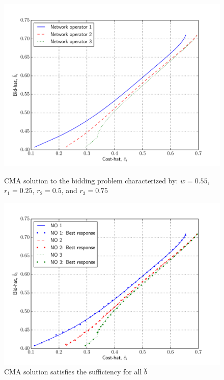 \begin{figure}[p!]
  \includegraphics[width=\figsize]{Indirect/Figures/combined_3}
  \caption{CMA solution to the bidding problem characterized by: $w=0.55$, $r_1 = 0.25$, $r_2 = 0.5$, and $r_3 = 0.75$}
  \label{fig:combined_3_indirect}
  \vspace{10mm}
  \includegraphics[width=\figsize]{Indirect/Figures/combined_3_sufficiency}
  \caption{CMA solution satisfies the sufficiency for all $\hat{b}$}
  \label{fig:combined_3_sufficiency_indirect}
\end{figure}

